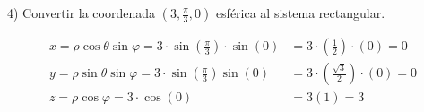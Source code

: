 \vspace{4mm}
4) Convertir la coordenada ${\left(3, \frac{\pi}{3},0\right)}$ esférica al sistema rectangular.

\begin{equation*}
  \begin{split}
    x = \rho \cos \theta \sin \varphi = 3 \cdot \sin \left(\frac{\pi}{3}\right) \cdot \sin \left(0\right) &= 3 \cdot \left(\frac{1}{2}\right) \cdot \left(0\right) = 0\\
    y = \rho \sin \theta \sin \varphi = 3 \cdot \sin \left(\frac{\pi}{3}\right) \sin \left(0\right) &= 3 \cdot \left(\frac{\sqrt{3}}{2}\right) \cdot \left(0\right) = 0\\
    z = \rho \cos \varphi = 3 \cdot \cos\left(0\right) &= 3\left(1\right) = 3
  \end{split}
\end{equation*}
